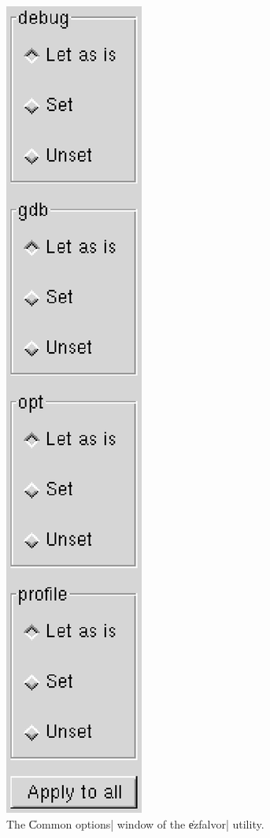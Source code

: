\begin{figure}
\begin{center}
\includegraphics[height=0.4\textheight]{Figures/options.eps}
\end{center}
\caption{The \|Common options| window of the \|ezfalvor| utility.}
\label{fig:options}
\end{figure}

